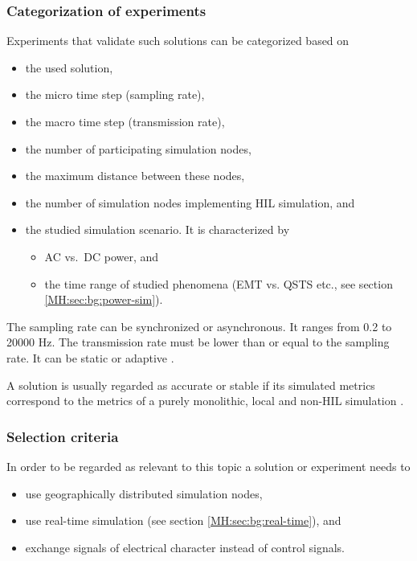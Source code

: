 \documentclass[a4paper,ngerman]{atseminar}
\begin{document}
\subsubsection{Categorization of experiments}
\label{MH:sec:cat-exp}

Experiments that validate such solutions can be categorized based on

\begin{itemize}
    \item the used solution,
    \item the micro time step (sampling rate),
    \item the macro time step (transmission rate), 
    \item the number of participating simulation nodes,
    \item the maximum distance between these nodes,
    \item the number of simulation nodes implementing HIL simulation, and
    \item the studied simulation scenario. It is characterized by
    \begin{itemize}
        \item AC vs.~DC power, and
        \item the time range of studied phenomena (EMT vs. QSTS etc., see section \ref{MH:sec:bg:power-sim}).
    \end{itemize}
\end{itemize}

The sampling rate can be synchronized or asynchronous. It ranges from 0.2 to 20000 Hz.
The transmission rate must be lower than or equal to the sampling rate. It can be static or adaptive \cite{vogel2019improve}.

A solution is usually regarded as accurate or stable if its simulated metrics correspond to the metrics of a purely monolithic, local and non-HIL simulation \cite{montoya2020}.

\subsubsection{Selection criteria}
\label{MH:sec:selection}

In order to be regarded as relevant to this topic a solution or experiment needs to

\begin{itemize}

	\item use geographically distributed simulation nodes,
    \item use real-time simulation (see section \ref{MH:sec:bg:real-time}), and
	\item exchange signals of electrical character instead of control signals.

\end{itemize}
\end{document}
